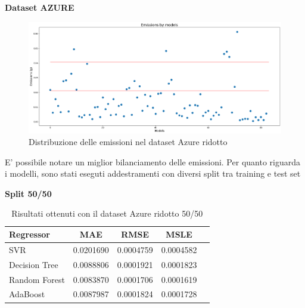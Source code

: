 \newpage


\noindent \textbf{Dataset AZURE}

\begin{figure}[H]
    \centering
    \includegraphics[scale=0.25]{images/nuova-situazione2-ridotto.png}
    \caption{Distribuzione delle emissioni nel dataset Azure ridotto}
\end{figure}


\noindent E’ possibile notare un miglior bilanciamento delle emissioni. Per quanto riguarda i modelli,
sono stati eseguti addestramenti con diversi split tra training e test set


\noindent\textbf{Split 50/50}


\begin{table}[H]
    \centering
    \begin{tabular}{|>{\centering\arraybackslash}m{5cm}|c|c|c|c|}
        \hline
        \textbf{Regressor} & \textbf{MAE} & \textbf{RMSE} & \textbf{MSLE} \\ [10pt]
        \hline
        SVR & 0.0201690 & 0.0004759 & 0.0004582 \\ [10pt]
        \hline
        Decision Tree & 0.0088806 & 0.0001921 & 0.0001823 \\ [10pt]
        \hline
        Random Forest & 0.0083870 & 0.0001706 & 0.0001619 \\ [10pt]
        \hline
        AdaBoost & 0.0087987 & 0.0001824 & 0.0001728 \\ [10pt]
        \hline
    \end{tabular}
    \caption{Risultati ottenuti con il dataset Azure ridotto 50/50}
    \label{tab:results}
\end{table}

